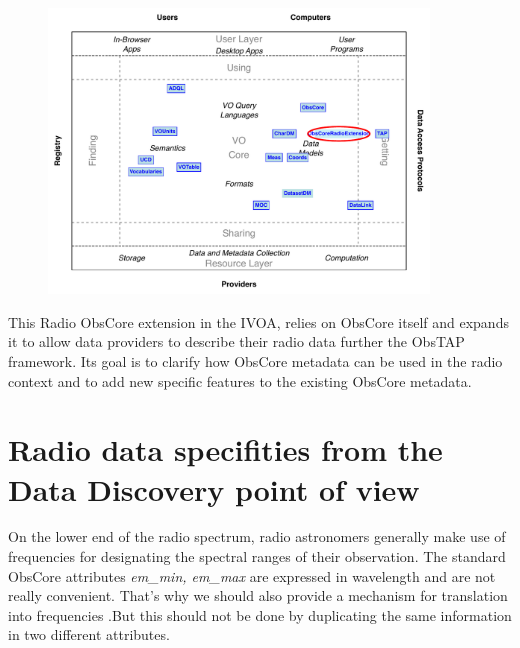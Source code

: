 \documentclass[11pt,a4paper]{ivoa}
\begin{document}
\begin{figure}
\includegraphics[width=0.9\textwidth]{role_diagram.pdf}
\label{fig:architecture}
\end{figure}

This Radio ObsCore extension in the IVOA, relies  on ObsCore itself and expands it
to allow data providers to describe their radio data further the  ObsTAP framework.
Its goal is to clarify how  ObsCore metadata  can be used in the  radio context and to add new specific features to the existing ObsCore metadata.


\section{Radio data specifities from the Data Discovery point of view}
\label{sec:specificities}


On the lower end of the radio spectrum, radio astronomers generally make use of
frequencies for designating the spectral ranges of their observation. The standard
ObsCore attributes \emph{em\_min, em\_max} are expressed in wavelength and are not really convenient.
That's why we should also provide a mechanism for  translation into frequencies .But this should not be done by duplicating the same information in two different attributes. 
\end{document}
